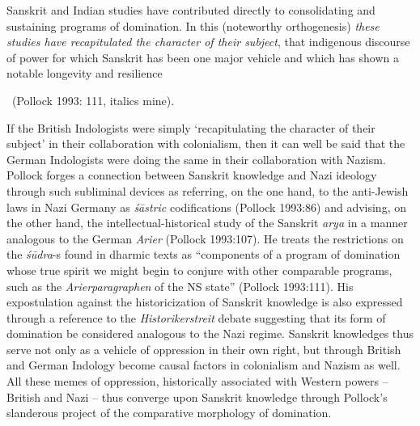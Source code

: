 \begin{myquote}
Sanskrit and Indian studies have contributed directly to   consolidating and sustaining programs of domination. In this (noteworthy orthogenesis) {\sl these studies have recapitulated the character of their subject}, that indigenous discourse of power for which Sanskrit has been one major vehicle and which has shown a notable longevity and resilience

~\hfill  (Pollock 1993: 111, italics mine).
\end{myquote}
If the British Indologists were simply ‘recapitulating the character of their subject’ in their collaboration with colonialism, then it can well be said that the German Indologists were doing the same in their collaboration with Nazism. Pollock forges a connection between Sanskrit knowledge and Nazi ideology through such subliminal devices as referring, on the one hand, to the anti-Jewish laws in Nazi Germany as {\sl śāstric} codifications (Pollock 1993:86) and advising, on the other hand, the intellectual-historical study of the Sanskrit {\sl arya} in a manner analogous to the German {\sl Arier} (Pollock 1993:107). He treats the restrictions on the {\sl śūdra}-s found in dharmic texts as “components of a program of domination whose true spirit we might begin to conjure with other comparable programs, such as the {\sl Arierparagraphen} of the NS state” (Pollock 1993:111). His expostulation against the historicization of Sanskrit knowledge is also expressed through a reference to the {\sl Historikerstreit} debate suggesting that its form of domination be considered analogous to the Nazi regime. Sanskrit knowledges thus serve not only as a vehicle of oppression in their own right, but through British and German Indology become causal factors in colonialism and Nazism as well. All these memes of oppression, historically associated with Western powers – British and Nazi – thus converge upon Sanskrit knowledge through Pollock’s slanderous project of the comparative morphology of domination.


